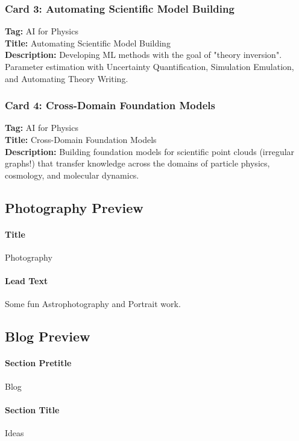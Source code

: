 \documentclass[11pt]{article}
\begin{document}
\subsubsection{Card 3: Automating Scientific Model Building}
\label{sec:home-card3}
\textbf{Tag:} AI for Physics\\
\textbf{Title:} Automating Scientific Model Building\\
\textbf{Description:} Developing ML methods with the goal of "theory inversion". Parameter estimation with Uncertainty Quantification, Simulation Emulation, and Automating Theory Writing.

\subsubsection{Card 4: Cross-Domain Foundation Models}
\label{sec:home-card4}
\textbf{Tag:} AI for Physics\\
\textbf{Title:} Cross-Domain Foundation Models\\
\textbf{Description:} Building foundation models for scientific point clouds (irregular graphs!) that transfer knowledge across the domains of particle physics, cosmology, and molecular dynamics.

\subsection{Photography Preview}
\label{sec:home-photography}

\paragraph{Title}
Photography

\paragraph{Lead Text}
Some fun Astrophotography and Portrait work.

\subsection{Blog Preview}
\label{sec:home-blog}

\paragraph{Section Pretitle}
Blog

\paragraph{Section Title}
Ideas
\end{document}
